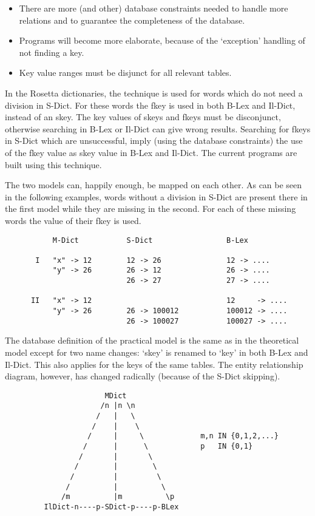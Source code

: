 \begin{itemize}
   \item There are more (and other) database constraints needed to handle more 
         relations and to guarantee the completeness of the database.
   \item Programs will become more elaborate, because of the `exception' 
         handling of not finding a key. 
   \item Key value ranges must be disjunct for all relevant tables.
\end{itemize}
      
In the Rosetta dictionaries, the technique is used for words which do not
need a division in S-Dict. For these words the fkey is used in both B-Lex and 
Il-Dict, instead of an skey. The key values of skeys and fkeys must be 
disconjunct, otherwise searching in B-Lex or Il-Dict can give wrong results. 
Searching for fkeys in S-Dict which are unsuccessful, imply (using the database 
constraints) the use of the fkey value as skey value in B-Lex and Il-Dict. 
The current programs are built using this technique.
 
The two models can, happily enough, be mapped on each other. As can be seen in 
the following examples, words without a division in S-Dict are present there in 
the first model while they are missing in the second. For each of these missing 
words the value of their fkey is used.
 
\begin{verbatim}
           M-Dict           S-Dict                 B-Lex
      
       I   "x" -> 12        12 -> 26               12 -> ....
           "y" -> 26        26 -> 12               26 -> ....
                            26 -> 27               27 -> ....
      
      II   "x" -> 12                               12     -> ....
           "y" -> 26        26 -> 100012           100012 -> ....
                            26 -> 100027           100027 -> ....
\end{verbatim}
 
The database definition of the practical model is the same as in the theoretical
model except 
for two name changes: `skey' is renamed to `key' in both B-Lex and Il-Dict. This
also applies for the keys of the same tables. The entity relationship diagram,
however, has changed radically (because of the S-Dict skipping). 
 
\begin{verbatim}
                       MDict
                      /n |n \n
                     /   |   \
                    /    |    \
                   /     |     \             m,n IN {0,1,2,...}
                  /      |      \            p   IN {0,1}
                 /       |       \
                /        |        \
               /         |         \
              /          |          \
             /m          |m          \p
         IlDict-n----p-SDict-p----p-BLex
\end{verbatim}
 
